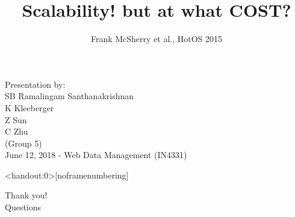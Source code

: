 \documentclass{beamer}
\title[]{Scalability! but at what COST?}
\author{Frank McSherry et al., HotOS 2015}
\date{}
\begin{document}
\begin{frame}[noframenumbering]
  \maketitle
  \vspace{2.25cm}
  \scriptsize{Presentation by:} \\
  \normalsize{
    SB Ramalingam Santhanakrishnan \\
    K Kleeberger \\
    Z Sun \\
    C Zhu \\
    (Group 5)\\
  }
  \vspace{0.6cm}
  \scriptsize{June 12, 2018 - Web Data Management (IN4331)}
\end{frame}











\begin{frame}<handout:0>[noframenumbering]
  \begin{center}
    \huge{Thank you!} \\
    \vspace{1.5cm}
    \large{Questions}
  \end{center}
\end{frame}
\end{document}
